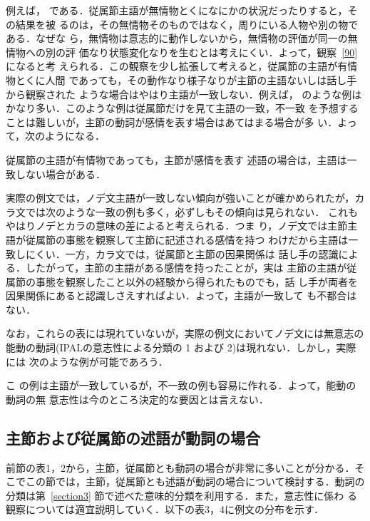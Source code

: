 例えば，
である．従属節主語が無情物とくになにかの状況だったりすると，その結果を被
るのは，その無情物そのものではなく，周りにいる人物や別の物である．なぜな
ら，無情物は意志的に動作しないから，無情物の評価が同一の無情物への別の評
価なり状態変化なりを生むとは考えにくい．よって，観察~\ref{90} になると考
えられる．この観察を少し拡張して考えると，従属節の主語が有情物とくに人間
であっても，その動作なり様子なりが主節の主語ないしは話し手から観察された
ような場合はやはり主語が一致しない．例えば，
のような例はかなり多い．このような例は従属節だけを見て主語の一致，不一致
を予想することは難しいが，主節の動詞が感情を表す場合はあてはまる場合が多
い．よって，次のようになる．
\begin{kousatu}\label{94}
従属節の主語が有情物であっても，主節が感情を表す
述語の場合は，主語は一致しない場合がある．
\end{kousatu}
実際の例文では，ノデ文主語が一致しない傾向が強いことが確かめられたが，カ
ラ文では次のような一致の例も多く，必ずしもその傾向は見られない．
これもやはりノデとカラの意味の差によると考えられる．つま
り，ノデ文では主節主語が従属節の事態を観察して主節に記述される感情を持つ
わけだから主語は一致しにくい．一方，カラ文では，従属節と主節の因果関係は
話し手の認識による．したがって，主節の主語がある感情を持ったことが，実は
主節の主語が従属節の事態を観察したこと以外の経験から得られたものでも，話
し手が両者を因果関係にあると認識しさえすればよい．よって，主語が一致して
も不都合はない．

なお，これらの表には現れていないが，実際の例文においてノデ文には無意志の
能動の動詞(IPALの意志性による分類の 1 および 2)は現れない．しかし，実際には
次のような例が可能であろう．

こ
の例は主語が一致しているが，不一致の例も容易に作れる．よって，能動の動詞の無
意志性は今のところ決定的な要因とは言えない．

\subsection{主節および従属節の述語が動詞の場合}

前節の表1，2から，主節，従属節とも動詞の場合が非常に多いことが分かる．そ
こでこの節では，主節，従属節とも述語が動詞の場合について検討する．動詞の
分類は第~\ref{section3} 節で述べた意味的分類を利用する．また，意志性に係わ
る観察については適宜説明していく．以下の表3，4に例文の分布を示す．

